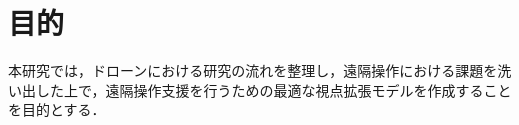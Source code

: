 



\section{目的}
本研究では，ドローンにおける研究の流れを整理し，遠隔操作における課題を洗い出した上で，遠隔操作支援を行うための最適な視点拡張モデルを作成することを目的とする．




